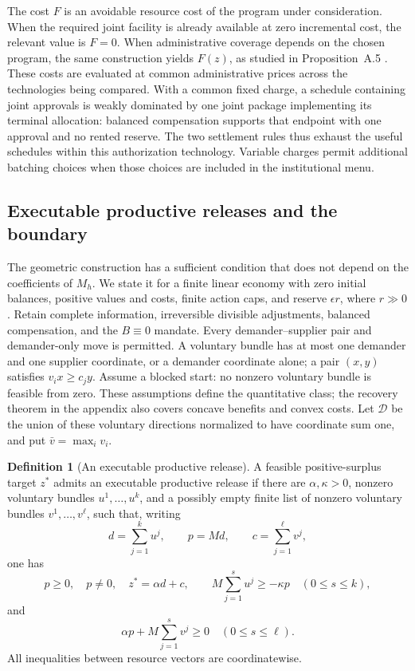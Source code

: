 \documentclass[ecta,draft]{econsocart}
\theoremstyle{definition}
\newtheorem{definition}[theorem]{Definition}
\theoremstyle{definition}
\begin{document}
The cost $F$ is an avoidable resource cost of the program under consideration.
When the required joint facility is already available at zero incremental
cost, the relevant value is $F=0$. When administrative coverage depends on
the chosen program, the same construction yields $F(z)$, as studied in
Proposition~A.5%
. These costs are evaluated at common
administrative prices across the technologies being compared. With a common
fixed charge, a schedule containing joint approvals is weakly dominated by
one joint package implementing its terminal allocation: balanced compensation
supports that endpoint with one approval and no rented reserve. The two
settlement rules thus exhaust the useful schedules within this authorization
technology. Variable charges permit additional batching choices when those
choices are included in the institutional menu.

\subsection{Executable productive releases and the boundary}
\label{sec:generalproductive}

The geometric construction has a sufficient condition that does not
depend on the coefficients of $M_h$. We state it for a finite linear
economy with zero initial balances, positive values and costs, finite
action caps, and reserve $\epsilon r$, where $r\gg0$. Retain complete
information, irreversible divisible adjustments, balanced compensation,
and the $B\equiv0$ mandate. Every demander--supplier pair and
demander-only move is permitted. A voluntary bundle has at most one demander
and one supplier coordinate, or a demander coordinate alone; a pair
$(x,y)$ satisfies $v_i x\geq c_jy$. Assume a blocked start: no nonzero
voluntary bundle is feasible from zero. These assumptions define the quantitative class; the recovery theorem in
the appendix also covers concave benefits and convex costs. Let $\mathcal D$ be
the union of these voluntary directions normalized to have coordinate sum one,
and put $\bar v=\max_i v_i$.

\begin{definition}[An executable productive release]
\label{def:executableproductive}
A feasible positive-surplus target $z^*$ admits an executable productive
release if there are $\alpha,\kappa>0$, nonzero voluntary bundles
$u^1,\ldots,u^k$, and a possibly empty finite list of nonzero voluntary
bundles $v^1,\ldots,v^\ell$, such that, writing
\[
 d=\sum_{j=1}^k u^j,\qquad p=Md,\qquad
 c=\sum_{j=1}^\ell v^j,
\]
one has
\[
 p\geq0,\quad p\ne0,\quad z^*=\alpha d+c,
 \qquad
 M\sum_{j=1}^s u^j\geq-\kappa p
 \quad(0\leq s\leq k),
\]
and
\[
 \alpha p+M\sum_{j=1}^s v^j\geq0
 \quad(0\leq s\leq\ell).
\]
All inequalities between resource vectors are coordinatewise.
\end{definition}
\end{document}
